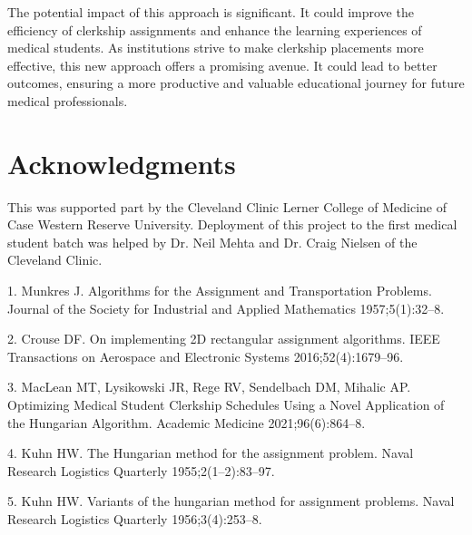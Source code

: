 \documentclass{article}
\begin{document}
The potential impact of this approach is significant. It could improve the efficiency of clerkship assignments and enhance the learning experiences of medical students. As institutions strive to make clerkship placements more effective, this new approach offers a promising avenue. It could lead to better outcomes, ensuring a more productive and valuable educational journey for future medical professionals.

\section*{Acknowledgments}
This was supported part by the Cleveland Clinic Lerner College of Medicine of Case Western Reserve University. Deployment of this project to the first medical student batch was helped by Dr. Neil Mehta and Dr. Craig Nielsen of the Cleveland Clinic.

  

1.  Munkres J. Algorithms for the Assignment and Transportation Problems. Journal of the Society for Industrial and Applied Mathematics 1957;5(1):32–8. 

2.  Crouse DF. On implementing 2D rectangular assignment algorithms. IEEE Transactions on Aerospace and Electronic Systems 2016;52(4):1679–96. 

3.  MacLean MT, Lysikowski JR, Rege RV, Sendelbach DM, Mihalic AP. Optimizing Medical Student Clerkship Schedules Using a Novel Application of the Hungarian Algorithm. Academic Medicine 2021;96(6):864–8. 

4.  Kuhn HW. The Hungarian method for the assignment problem. Naval Research Logistics Quarterly 1955;2(1–2):83–97. 

5.  Kuhn HW. Variants of the hungarian method for assignment problems. Naval Research Logistics Quarterly 1956;3(4):253–8. 
\end{document}
